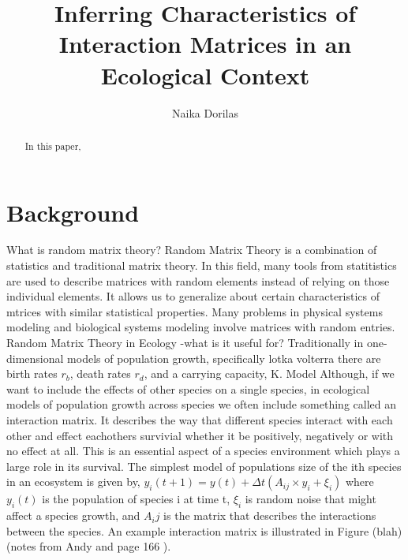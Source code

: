 \documentclass{article}
\begin{document}
\title{Inferring Characteristics of Interaction Matrices in an Ecological Context{}}
\author{Naika Dorilas}

\maketitle

\begin{abstract}
In this paper, 
\end{abstract}

\section{Background}
What is random matrix theory?\hfill\break
Random Matrix Theory is a combination of statistics and traditional matrix theory. In this field, many tools from statitistics are used to describe matrices with random elements instead of relying on those individual elements. It allows us to generalize about certain characteristics of mtrices with similar statistical properties. Many problems in physical systems modeling and biological systems modeling involve matrices with random entries. \hfill\break
Random Matrix Theory in Ecology\hfill\break
-what is it useful for?\hfill\break
Traditionally in one-dimensional models of population growth, specifically lotka volterra there are birth rates $r_b$, death rates $r_d$, and a carrying capacity, K.  \hfill\break
\hfill\break Model \hfill\break \hfill\break
Although, if we want to include the effects of other species on a single species, in ecological models of population growth across species we often include something called an interaction matrix. It describes the way that different species interact with each other and effect eachothers survivial whether it be positively, negatively or with no effect at all. This is an essential aspect of a species environment which plays a large role in its survival. The simplest model of populations size of the ith species in an ecosystem is given by,\hfill\break
\hfill\break 
$y_i(t+1)=y(t) + \Delta t(A_{ij}\times y_i +\xi_i)$
\hfill\break
where $y_i(t)$ is the population of species i at time t, $\xi_i$ is random noise that might affect a species growth, and $A_ij$ is the matrix that describes the interactions between the species.
\hfill\break 
An example interaction matrix is illustrated in Figure (blah)(notes from Andy and page 166 ). 
\end{document}
